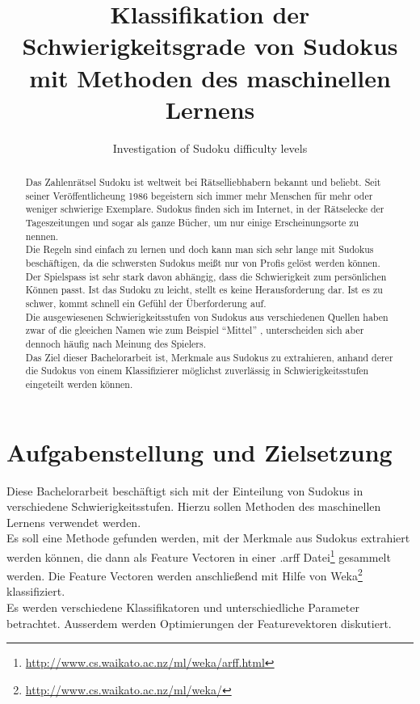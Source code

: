 \documentclass[accentcolor=tud6b,11pt,paper=a4]{tudreport}
\title{Klassifikation der Schwierigkeitsgrade von Sudokus mit Methoden des maschinellen Lernens}
\subtitle{Investigation of Sudoku difficulty levels}
\begin{document}
\maketitle

\begin{abstract}
Das Zahlenr\"atsel Sudoku ist weltweit bei R\"atselliebhabern bekannt und beliebt. Seit seiner Ver\"offentlicheung 1986 begeistern sich immer mehr Menschen f\"ur mehr oder weniger schwierige Exemplare. Sudokus finden sich im Internet, in der R\"atselecke der Tageszeitungen und sogar als ganze B\"ucher, um nur einige Erscheinungsorte zu nennen. \\
Die Regeln sind einfach zu lernen und doch kann man sich sehr lange mit Sudokus besch\"aftigen, da die schwersten Sudokus meißt nur von Profis gel\"ost werden k\"onnen.\\
Der Spielspass ist sehr stark davon abh\"angig, dass die Schwierigkeit zum pers\"onlichen K\"onnen passt. Ist das Sudoku zu leicht, stellt es keine Herausforderung dar. Ist es zu schwer, kommt schnell ein Gef\"uhl der \"Uberforderung auf. \\
Die ausgewiesenen Schwierigkeitsstufen von Sudokus aus verschiedenen Quellen haben zwar of die gleeichen Namen wie zum Beispiel 
\textquotedblleft Mittel\textquotedblright
, unterscheiden sich aber dennoch h\"aufig nach Meinung des Spielers.\\
Das Ziel dieser Bachelorarbeit ist, Merkmale aus Sudokus zu extrahieren, anhand derer die Sudokus von einem Klassifizierer m\"oglichst zuverl\"assig in Schwierigkeitsstufen eingeteilt werden k\"onnen.\\
\end{abstract}

\tableofcontents

\chapter{Aufgabenstellung und Zielsetzung}
Diese Bachelorarbeit besch\"aftigt sich mit der Einteilung von Sudokus in verschiedene Schwierigkeitsstufen. Hierzu sollen Methoden des maschinellen Lernens verwendet werden. \\ Es soll eine Methode gefunden werden, mit der Merkmale aus Sudokus extrahiert werden können, die dann als Feature Vectoren in einer .arff Datei\footnote{\url{http://www.cs.waikato.ac.nz/ml/weka/arff.html}} gesammelt werden. Die Feature Vectoren werden anschließend mit Hilfe von Weka\footnote{\url{http://www.cs.waikato.ac.nz/ml/weka/}} klassifiziert.\\
Es werden verschiedene Klassifikatoren und unterschiedliche Parameter betrachtet. Ausserdem werden Optimierungen der Featurevektoren diskutiert.
\end{document}
